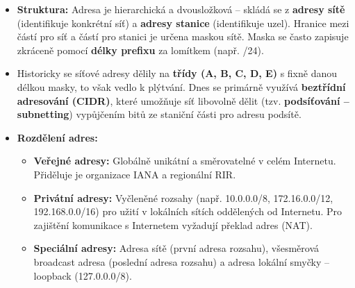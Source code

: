             \begin{itemize}

                \item \textbf{Struktura:} Adresa je hierarchická a dvousložková -- skládá se z \textbf{adresy sítě} (identifikuje konkrétní síť) a \textbf{adresy stanice} (identifikuje uzel). Hranice mezi částí pro síť a částí pro stanici je určena maskou sítě. Maska se často zapisuje zkráceně pomocí \textbf{délky prefixu} za lomítkem (např. /24).
                \item Historicky se síťové adresy dělily na \textbf{třídy (A, B, C, D, E)} s fixně danou délkou masky, to však vedlo k plýtvání. Dnes se primárně využívá \textbf{beztřídní adresování (CIDR)}, které umožňuje síť libovolně dělit (tzv. \textbf{podsíťování -- subnetting}) vypůjčením bitů ze staniční části pro adresu podsítě.
                \item \textbf{Rozdělení adres:}
                \begin{itemize}
                    \item \textbf{Veřejné adresy:} Globálně unikátní a směrovatelné v celém Internetu. Přiděluje je organizace IANA a regionální RIR.
                    \item \textbf{Privátní adresy:} Vyčleněné rozsahy (např. 10.0.0.0/8, 172.16.0.0/12, 192.168.0.0/16) pro užití v lokálních sítích oddělených od Internetu. Pro zajištění komunikace s Internetem vyžadují překlad adres (NAT).
                    \item \textbf{Speciální adresy:} Adresa sítě (první adresa rozsahu), všesměrová broadcast adresa (poslední adresa rozsahu) a adresa lokální smyčky -- loopback (127.0.0.0/8).
                \end{itemize}
            \end{itemize}
